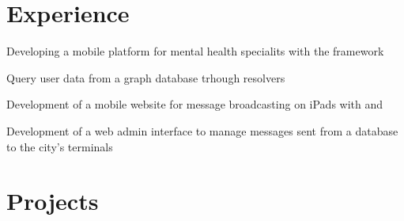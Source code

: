 \documentclass[]{deedy-resume-openfont}
\begin{document}
\hfill
\begin{minipage}[t]{0.66\textwidth} 
  

\section{Experience}

\hfill
\hfill

\begin{tightemize}
\item Developing a mobile platform for mental health specialits with the  framework
\item Query user data from a  graph database trhough  resolvers
\end{tightemize}

\sectionsep

\begin{tightemize}
\item Development of a mobile website for message broadcasting on iPads with  and 
\item Development of a web admin interface to manage messages sent from a database to the city’s terminals
\end{tightemize}


\section{Projects}



\end{minipage}
\end{document}
